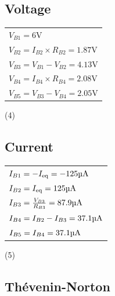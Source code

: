 \documentclass[12pt]{article}
\begin{document}
\begin{multicols}{2}
	\begin{center}
		\subsection*{Voltage}
		\begin{tabular}{l}
			$V_{B1}=\mathrm{6V}$ \vspace{4pt}                        \\
			$V_{B2}=I_{B2}\times R_{B2}=1.87\mathrm{V}$ \vspace{4pt} \\
			$V_{B3}=V_{B1}-V_{B2}=4.13\mathrm{V}$ \vspace{4pt}       \\
			$V_{B4}=I_{B4}\times R_{B4}=2.08\mathrm{V}$ \vspace{4pt} \\
			$V_{B5}=V_{B3}-V_{B4}=2.05\mathrm{V}$
		\end{tabular}
		(4)
	\end{center}
	\begin{center}
		\subsection*{Current}
		\begin{tabular}{l}
			$I_{B1}=-I_{\mathrm{eq}}=-125\textrm{\textmu A}$ \vspace{4pt}      \\
			$I_{B2}=I_{\mathrm{eq}}=125\textrm{\textmu A}$ \vspace{4pt}        \\
			$I_{B3}=\frac{V_{B3}}{R_{B3}}=87.9\textrm{\textmu A}$ \vspace{4pt} \\
			$I_{B4}=I_{B2}-I_{B3}=37.1\textrm{\textmu A}$ \vspace{4pt}         \\
			$I_{B5}=I_{B4}=37.1\textrm{\textmu A}$
		\end{tabular}
		(5)
	\end{center}
\end{multicols}

\clearpage

\subsection*{Th\'evenin-Norton}
\end{document}
